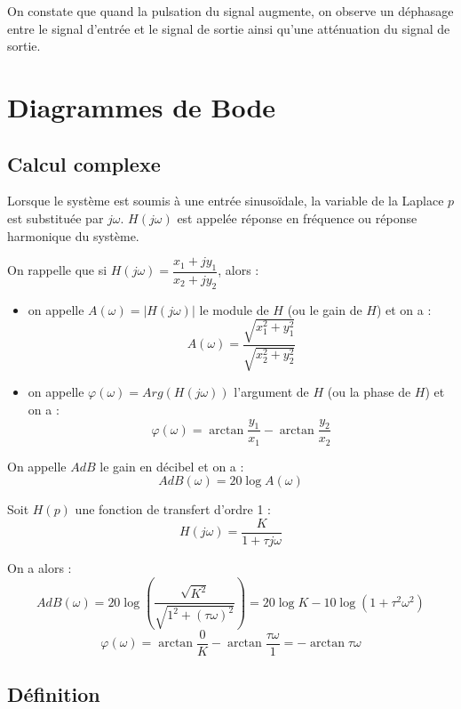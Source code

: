 \documentclass[10pt,oneside]{article}
\begin{document}
On constate que quand la pulsation du signal augmente, on observe un déphasage entre le signal d'entrée et le signal de sortie ainsi qu'une atténuation du signal de sortie. 

\section{Diagrammes de Bode}

\subsection{Calcul complexe}
Lorsque le système est soumis à une entrée sinusoïdale, la variable de la Laplace $p$ est substituée par $j\omega$. $H(j\omega)$ est appelée réponse en fréquence ou réponse harmonique du système.

\begin{resultat}
On rappelle que si $H(j\omega) = \dfrac{x_1+jy_1}{x_2+jy_2}$, alors : 
\begin{itemize}
\item on appelle $A(\omega)=|H(j\omega)|$ le module de $H$ (ou le gain de $H$) et on a : 
$$
A(\omega)= \dfrac{\sqrt{x_1^2+y_1^2}}{\sqrt{x_2^2+y_2^2}}
$$
\item on appelle $\varphi(\omega)=Arg(H(j\omega))$ l'argument de $H$ (ou la phase de $H$) et on a : 
$$
\varphi(\omega)= \arctan \dfrac{y_1}{x_1}-\arctan \dfrac{y_2}{x_2}
$$
\end{itemize}
\end{resultat}

\begin{rem}
On appelle $AdB$ le gain en décibel et on a :
$$
AdB(\omega)=20 \log A(\omega)
$$
\end{rem}

\begin{exemple}
Soit $H(p)$ une fonction de transfert d'ordre 1 :
$$
H(j\omega)= \dfrac{K}{1+\tau j\omega }
$$

On a alors : 
$$
AdB(\omega) = 20 \log \left(\dfrac{\sqrt{K^2}}{\sqrt{1^2+(\tau\omega)^2}}\right) = 20 \log K - 10 \log \left(1+\tau^2\omega^2 \right)
$$
$$
\varphi(\omega)= \arctan \dfrac{0}{K}-\arctan \dfrac{\tau\omega}{1} = - \arctan \tau\omega
$$

\end{exemple}

\subsection{Définition}
\end{document}
